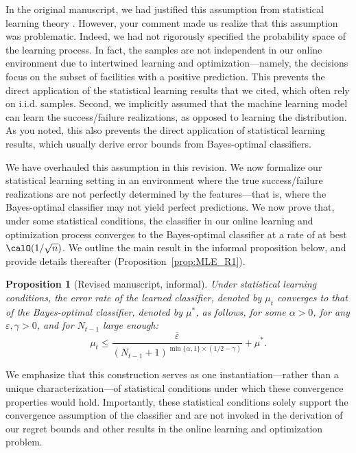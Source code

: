 \documentclass[11pt]{article}
\newtheorem{proposition}{Proposition}[]
\begin{document}
In the original manuscript, we had justified this assumption from statistical learning theory \citep[using, for instance][]{chaudhuri2014rates,ng2001discriminative,mansour2000generalization,ng2001discriminative,gao2020towards}. However, your comment made us realize that this assumption was problematic. Indeed, we had not rigorously specified the probability space of the learning process. In fact, the samples are not independent in our online environment due to intertwined learning and optimization---namely, the decisions focus on the subset of facilities with a positive prediction. This prevents the direct application of the statistical learning results that we cited, which often rely on i.i.d. samples. Second, we implicitly assumed that the machine learning model can learn the success/failure realizations, as opposed to learning the distribution. As you noted, this also prevents the direct application of statistical learning results, which usually derive error bounds from Bayes-optimal classifiers.

We have overhauled this assumption in this revision. We now formalize our statistical learning setting in an environment where the true success/failure realizations are not perfectly determined by the features---that is, where the Bayes-optimal classifier may not yield perfect predictions. We now prove that, under some statistical conditions, the classifier in our online learning and optimization process converges to the Bayes-optimal classifier at a rate of at best $\calO(1/\sqrt{n})$. We outline the main result in the informal proposition below, and provide details thereafter (Proposition~\ref{prop:MLE_R1}).
\setcounter{proposition}{0}
\begin{proposition}[Revised manuscript, informal]\label{prop:MLE_informal_R1}
       Under statistical learning conditions, the error rate of the learned classifier, denoted by $\mu_t$ converges to that of the Bayes-optimal classifier, denoted by $\mu^*$, as follows, for some $\alpha>0$, for any $\varepsilon,\gamma>0$, and for $N_{t-1}$ large enough:
        \[\mu_t \leq \frac{\overline\varepsilon}{(N_{t-1}+1)^{\min\{\alpha,1\}\times (1/2-\gamma)}}+\mu^*.\]
\end{proposition}

We emphasize that this construction serves as one instantiation—rather than a unique characterization—of statistical conditions under which these convergence properties would hold. Importantly, these statistical conditions solely support the convergence assumption of the classifier and are not invoked in the derivation of our regret bounds and other results in the online learning and optimization problem.
\end{document}

